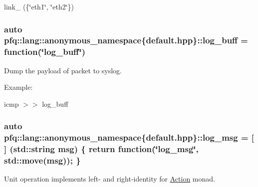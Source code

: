 link\+\_\+ (\{\char`\"{}eth1\char`\"{}, \char`\"{}eth2\char`\"{}\}) 
\subsubsection[{\texorpdfstring{log\+\_\+buff}{log_buff}}]{\setlength{\rightskip}{0pt plus 5cm}auto pfq\+::lang\+::anonymous\+\_\+namespace\{default.\+hpp\}\+::log\+\_\+buff = {\bf function}(\char`\"{}log\+\_\+buff\char`\"{})}\hypertarget{namespacepfq_1_1lang_1_1anonymous__namespace_02default_8hpp_03_ac16d4c4b496e6e882901d84ded462101}{}\label{namespacepfq_1_1lang_1_1anonymous__namespace_02default_8hpp_03_ac16d4c4b496e6e882901d84ded462101}


Dump the payload of packet to syslog. 

Example\+:

icmp $>$$>$ log\+\_\+buff 
\subsubsection[{\texorpdfstring{log\+\_\+msg}{log_msg}}]{\setlength{\rightskip}{0pt plus 5cm}auto pfq\+::lang\+::anonymous\+\_\+namespace\{default.\+hpp\}\+::log\+\_\+msg = \mbox{[}$\,$\mbox{]} (std\+::string msg) \{ return {\bf function}(\char`\"{}log\+\_\+msg\char`\"{}, std\+::move(msg)); \}}\hypertarget{namespacepfq_1_1lang_1_1anonymous__namespace_02default_8hpp_03_a82e76226844f043aac9a2dd01615c9bb}{}\label{namespacepfq_1_1lang_1_1anonymous__namespace_02default_8hpp_03_a82e76226844f043aac9a2dd01615c9bb}


Unit operation implements left-\/ and right-\/identity for \hyperlink{structpfq_1_1lang_1_1Action}{Action} monad. 

